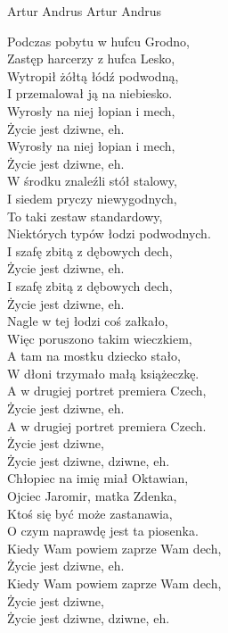 {Artur Andrus}
{Artur Andrus}
\begin{text}
Podczas pobytu w hufcu Grodno,\\
Zastęp harcerzy z hufca Lesko,\\
Wytropił żółtą łódź podwodną,\\
I przemalował ją na niebiesko.\\

Wyrosły na niej łopian i mech,\\
Życie jest dziwne, eh.\\
Wyrosły na niej łopian i mech,\\
Życie jest dziwne, eh.\\

W środku znaleźli stół stalowy,\\
I siedem pryczy niewygodnych,\\
To taki zestaw standardowy,\\
Niektórych typów łodzi podwodnych.\\

I szafę zbitą z dębowych dech,\\
Życie jest dziwne, eh.\\
I szafę zbitą z dębowych dech,\\
Życie jest dziwne, eh.\\

Nagle w tej łodzi coś załkało,\\
Więc poruszono takim wieczkiem,\\
A tam na mostku dziecko stało,\\
W dłoni trzymało małą książeczkę.\\

A w drugiej portret premiera Czech,\\
Życie jest dziwne, eh.\\
A w drugiej portret premiera Czech.\\
Życie jest dziwne, \\
Życie jest dziwne, dziwne, eh.\\

Chłopiec na imię miał Oktawian,\\
Ojciec Jaromir, matka Zdenka,\\
Ktoś się być może zastanawia,\\
O czym naprawdę jest ta piosenka.\\

Kiedy Wam powiem zaprze Wam dech,\\
Życie jest dziwne, eh.\\
Kiedy Wam powiem zaprze Wam dech,\\
Życie jest dziwne, \\
Życie jest dziwne, dziwne, eh.\\


\end{text}
